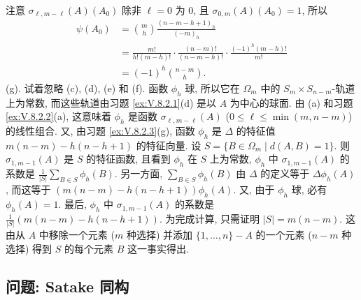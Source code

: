 \begin{solution}
注意 $\sigma_{\ell,m-\ell}(A)(A_0)$ 除非 $\ell = 0$ 为 $0$, 且 $\sigma_{0,m}(A)(A_0) = 1$, 所以
\begin{align*}
\psi(A_0) &= \binom{m}{h}\frac{(n - m - h + 1)_h}{(-m)_h} \\
&= \frac{m!}{h!(m-h)!}\cdot\frac{(n-m)!}{(n-m-h)!}\cdot\frac{(-1)^h(m-h)!}{m!} \\
&= (-1)^h\binom{n-m}{h}.
\end{align*}
(g). 试着忽略 (c), (d), (e) 和 (f).
函数 $\phi_h$ 球, 所以它在 $\Omega_m$ 中的 $S_m \times S_{n-m}$-轨道上为常数, 而这些轨道由习题 \ref{ex:V.8.2.1}(d) 是以 $A$ 为中心的球面. 由 (a) 和习题 \ref{ex:V.8.2.2}(a), 这意味着 $\phi_h$ 是函数 $\sigma_{\ell,m-\ell}(A)$ ($0 \leq \ell \leq \min(m, n-m)$) 的线性组合. 又, 由习题 \ref{ex:V.8.2.3}(g), 函数 $\phi_h$ 是 $\Delta$ 的特征值 $m(n-m) - h(n-h+1)$ 的特征向量. 设 $S = \{B \in \Omega_m \mid d(A, B) = 1\}$. 则 $\sigma_{1,m-1}(A)$ 是 $S$ 的特征函数, 且看到 $\phi_h$ 在 $S$ 上为常数, $\phi_h$ 中 $\sigma_{1,m-1}(A)$ 的系数是 $\frac{1}{|S|}\sum_{B \in S}\phi_h(B)$.
另一方面, $\sum_{B \in S}\phi_h(B)$ 由 $\Delta$ 的定义等于 $\Delta\phi_h(A)$, 而这等于 $(m(n-m) - h(n-h+1))\phi_h(A)$. 又, 由于 $\phi_h$ 球, 必有 $\phi_h(A) = 1$. 最后, $\phi_h$ 中 $\sigma_{1,m-1}(A)$ 的系数是 $\frac{1}{|S|}(m(n-m) - h(n-h+1))$. 为完成计算, 只需证明 $|S| = m(n-m)$. 这由从 $A$ 中移除一个元素 ($m$ 种选择) 并添加 $\{1, \ldots, n\} - A$ 的一个元素 ($n - m$ 种选择) 得到 $S$ 的每个元素 $B$ 这一事实得出.
\end{solution}

\subsection{问题: Satake 同构}
\label{sec:V.8.3}

